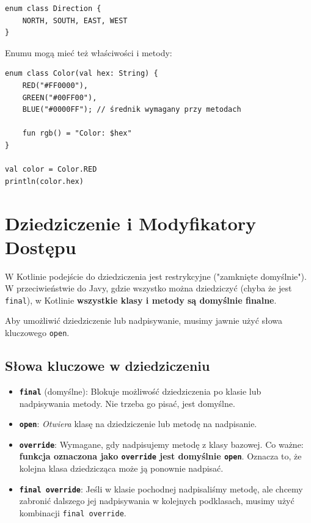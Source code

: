 \begin{verbatim}
enum class Direction {
    NORTH, SOUTH, EAST, WEST
}
\end{verbatim}

Enumu mogą mieć też właściwości i metody:

\begin{verbatim}
enum class Color(val hex: String) {
    RED("#FF0000"),
    GREEN("#00FF00"),
    BLUE("#0000FF"); // średnik wymagany przy metodach

    fun rgb() = "Color: $hex"
}

val color = Color.RED
println(color.hex)
\end{verbatim}

\section{Dziedziczenie i Modyfikatory Dostępu}

W Kotlinie podejście do dziedziczenia jest restrykcyjne ("zamknięte domyślnie"). W przeciwieństwie do Javy, gdzie wszystko można dziedziczyć (chyba że jest \texttt{final}), w Kotlinie \textbf{wszystkie klasy i metody są domyślnie finalne}.

Aby umożliwić dziedziczenie lub nadpisywanie, musimy jawnie użyć słowa kluczowego \texttt{open}.

\subsection{Słowa kluczowe w dziedziczeniu}

\begin{itemize}
    \item \textbf{\texttt{final}} (domyślne): Blokuje możliwość dziedziczenia po klasie lub nadpisywania metody. Nie trzeba go pisać, jest domyślne.
    \item \textbf{\texttt{open}}: \textit{Otwiera} klasę na dziedziczenie lub metodę na nadpisanie.
    \item \textbf{\texttt{override}}: Wymagane, gdy nadpisujemy metodę z klasy bazowej. Co ważne: \textbf{funkcja oznaczona jako \texttt{override} jest domyślnie \texttt{open}}. Oznacza to, że kolejna klasa dziedzicząca może ją ponownie nadpisać.
    \item \textbf{\texttt{final override}}: Jeśli w klasie pochodnej nadpisaliśmy metodę, ale chcemy zabronić dalszego jej nadpisywania w kolejnych podklasach, musimy użyć kombinacji \texttt{final override}.
\end{itemize}

